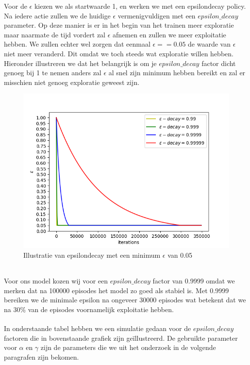 \documentclass[11pt]{article}
\begin{document}
Voor de $\epsilon$ kiezen we als startwaarde 1, en werken we met een epsilondecay policy. Na iedere actie zullen we de huidige $\epsilon$ vermenigvuldigen met een $epsilon\_decay$ parameter. Op deze manier is er in het begin van het trainen meer exploratie maar naarmate de tijd vordert zal $\epsilon$ afnemen en zullen we meer exploitatie hebben. We zullen echter wel zorgen dat eenmaal $\epsilon == 0.05$ de waarde van $\epsilon$ niet meer veranderd. Dit omdat we toch steeds wat exploratie willen hebben.\\
Hieronder illustreren we dat het belangrijk is om je $epsilon\_decay$ factor dicht genoeg bij 1 te nemen anders zal $\epsilon$ al snel zijn minimum hebben bereikt en zal er misschien niet genoeg exploratie geweest zijn.\\ 
\begin{figure}[h]
\centering
\includegraphics[scale=0.50]{images/epsilon_decay.png}
\caption{Illustratie van epsilondecay met een minimum $\epsilon$ van 0.05}
\end{figure}
\\
Voor ons model kozen wij voor een $epsilon\_decay$ factor van 0.9999 omdat we merken dat na 100000 episodes het model zo goed als stabiel is. Met 0.9999 bereiken we de minimale epsilon na ongeveer 30000 episodes wat betekent dat we na 30\% van de episodes voornamelijk exploitatie hebben.\\\\
In onderstaande tabel hebben we een simulatie gedaan voor de $epsilon\_decay$ factoren die in bovenstaande grafiek zijn geïllustreerd. De gebruikte parameter voor $\alpha$ en $\gamma$ zijn de parameters die we uit het onderzoek in de volgende paragrafen zijn bekomen.
\end{document}
